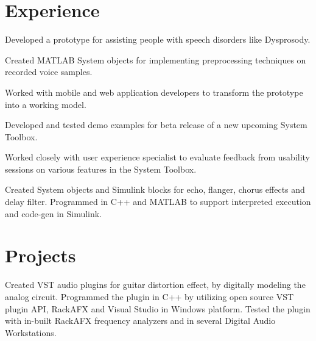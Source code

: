 \documentclass[]{deedy-resume-openfont}
\begin{document}
\hfill
\begin{minipage}[t]{0.73\textwidth} 


\section{Experience}

\vspace{\topsep} %
\begin{tightemize}
\item Developed a prototype for assisting people with speech disorders like Dysprosody. 
\item Created MATLAB System objects for implementing preprocessing techniques on recorded voice samples.
\item Worked with mobile and web application developers to transform the prototype into a working model.
\end{tightemize}
\sectionsep

\begin{tightemize}
\item Developed and tested demo examples for beta release of a new upcoming System Toolbox. 
\item Worked closely with user experience specialist to evaluate feedback from usability sessions on various features in the System Toolbox.
\item Created System objects and Simulink blocks for echo, flanger, chorus effects and delay filter. Programmed in C++ and MATLAB to support interpreted execution and code-gen in Simulink.
\end{tightemize}
\sectionsep


\section{Projects}
\sectionsep

 
Created VST audio plugins for guitar distortion effect, by digitally modeling the analog circuit. Programmed the plugin in C++ by utilizing open source VST plugin API, RackAFX and Visual Studio in Windows platform. Tested the plugin with in-built RackAFX frequency analyzers and in several Digital Audio Workstations.


\end{minipage}
\end{document}
